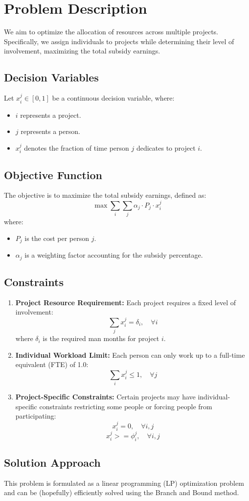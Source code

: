 \documentclass{article}
\begin{document}
	
	\section*{Problem Description}
	
	We aim to optimize the allocation of resources across multiple projects. Specifically, we assign individuals to projects while determining their level of involvement, maximizing the total subsidy earnings.

	
	\subsection*{Decision Variables}
	Let \( x_i^j \in [0,1] \) be a continuous decision variable, where:
	\begin{itemize}
		\item \( i \) represents a project.
		\item \( j \) represents a person.
		\item \( x_i^j \) denotes the fraction of time person \( j \) dedicates to project \( i \).
	\end{itemize}
	
	\subsection*{Objective Function}
	The objective is to maximize the total subsidy earnings, defined as:
	\[
	\max \sum_{i} \sum_{j} \alpha_j  \cdot P_j\cdot x_i^j
	\]
	where:
	\begin{itemize}
		\item \( P_j \) is the cost per person $j$.
		\item \( \alpha_j \) is a weighting factor accounting for the subsidy percentage.
	\end{itemize}
	
	\subsection*{Constraints}
	\begin{enumerate}
		\item \textbf{Project Resource Requirement:  }
		Each project requires a fixed level of involvement:
		\[
		\sum_j x_i^j  = \delta_i, \quad \forall i
		\]
		where \( \delta_i \) is the required man months for project \( i \).
	
	    \item \textbf{Individual Workload Limit:  }
		Each person can only work up to a full-time equivalent (FTE) of 1.0:
		\[
		\sum_i x_i^j \leq 1, \quad \forall j
		\]
		
		\item \textbf{Project-Specific Constraints:  }
		Certain projects may have individual-specific constraints restricting some people or forcing people from participating:
		\[
		x_i^j = 0, \quad \forall i, j
		\]
		\[
		x_i^j >= \phi_i^j, \quad \forall i, j
		\]
\end{enumerate}

\subsection*{Solution Approach}
This problem is formulated as a linear programming (LP) optimization problem and can be (hopefully) efficiently solved using the Branch and Bound method.

	
\end{document}

